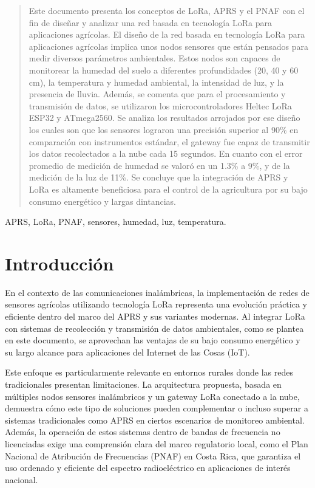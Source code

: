 \documentclass[conference]{IEEEtran}
\begin{document}
\begin{abstract}
Este documento presenta los conceptos de LoRa, APRS y el PNAF con el fin de diseñar y analizar una red basada en tecnología LoRa para aplicaciones agrícolas. El diseño de la red basada en tecnología LoRa para aplicaciones agrícolas implica unos nodos sensores que están pensados para medir diversos parámetros ambientales. Estos nodos son capaces de monitorear la humedad del suelo a diferentes profundidades (20, 40 y 60 cm), la temperatura y humedad ambiental, la intensidad de luz, y la presencia de lluvia. Además, se comenta que para el procesamiento y transmisión de datos, se utilizaron los microcontroladores Heltec LoRa ESP32 y ATmega2560. Se analiza los resultados arrojados por ese diseño los cuales son que los sensores lograron una precisión superior al 90\% en comparación con instrumentos estándar, el gateway fue capaz de transmitir los datos recolectados a la nube cada 15 segundos. En cuanto con el error promedio de medición de humedad se valoró en un 1.3\% a 9\%, y de la medición de la luz de 11\%. Se concluye que la integración de APRS y LoRa es altamente beneficiosa para el control de la agricultura por su bajo consumo energético y largas dintancias.
   
\end{abstract}
\begin{IEEEkeywords}
APRS, LoRa, PNAF, sensores, humedad, luz, temperatura.
\end{IEEEkeywords}

\section{\textbf{Introducción}}
En el contexto de las comunicaciones inalámbricas, la implementación de redes de sensores agrícolas utilizando tecnología LoRa representa una evolución práctica y eficiente dentro del marco del APRS y sus variantes modernas. Al integrar LoRa con sistemas de recolección y transmisión de datos ambientales, como se plantea en este documento, se aprovechan las ventajas de su bajo consumo energético y su largo alcance para aplicaciones del Internet de las Cosas (IoT). 

\vspace{2mm}

Este enfoque es particularmente relevante en entornos rurales donde las redes tradicionales presentan limitaciones. La arquitectura propuesta, basada en múltiples nodos sensores inalámbricos y un gateway LoRa conectado a la nube, demuestra cómo este tipo de soluciones pueden complementar o incluso superar a sistemas tradicionales como APRS en ciertos escenarios de monitoreo ambiental. Además, la operación de estos sistemas dentro de bandas de frecuencia no licenciadas exige una comprensión clara del marco regulatorio local, como el Plan Nacional de Atribución de Frecuencias (PNAF) en Costa Rica, que garantiza el uso ordenado y eficiente del espectro radioeléctrico en aplicaciones de interés nacional.
\end{document}
